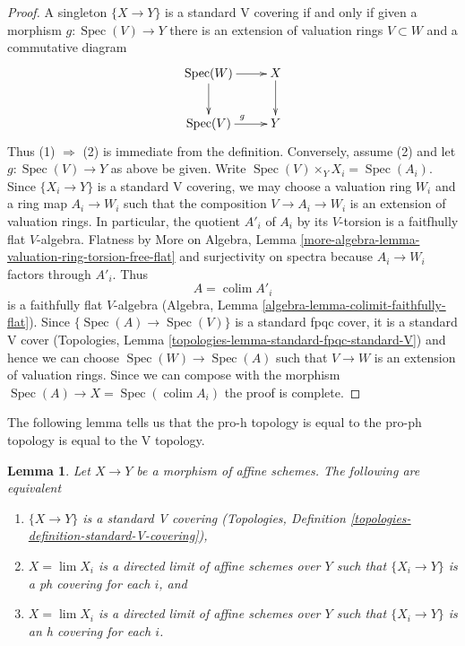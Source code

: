\documentclass{stacks-project}
\theoremstyle{plain}
\newtheorem{lemma}[subsection]{Lemma}
\theoremstyle{definition}
\theoremstyle{remark}
\numberwithin{equation}{subsection}
\def\lim{\mathop{\mathrm{lim}}\nolimits}
\def\colim{\mathop{\mathrm{colim}}\nolimits}
\def\Spec{\mathop{\mathrm{Spec}}}
\begin{document}
\begin{proof}
A singleton $\{X \to Y\}$ is a standard V covering if and only if
given a morphism $g : \Spec(V) \to Y$ there is an extension of
valuation rings $V \subset W$ and a commutative diagram
$$
\xymatrix{
\Spec(W) \ar[r] \ar[d] & X \ar[d] \\
\Spec(V) \ar[r]^g & Y
}
$$
Thus (1) $\Rightarrow$ (2) is immediate from the definition.
Conversely, assume (2) and let $g : \Spec(V) \to Y$ as above
be given. Write $\Spec(V) \times_Y X_i = \Spec(A_i)$.
Since $\{X_i \to Y\}$ is a standard V covering, we may choose
a valuation ring $W_i$ and a ring map $A_i \to W_i$ such that
the composition $V \to A_i \to W_i$ is an extension of valuation
rings. In particular, the quotient $A'_i$ of $A_i$ by its
$V$-torsion is a faitfhully flat $V$-algebra. Flatness by
More on Algebra, Lemma
\ref{more-algebra-lemma-valuation-ring-torsion-free-flat} and
surjectivity on spectra because $A_i \to W_i$ factors through $A'_i$.
Thus
$$
A = \colim A'_i
$$
is a faithfully flat $V$-algebra
(Algebra, Lemma \ref{algebra-lemma-colimit-faithfully-flat}).
Since $\{\Spec(A) \to \Spec(V)\}$ is a standard fpqc cover, it
is a standard V cover
(Topologies, Lemma \ref{topologies-lemma-standard-fpqc-standard-V})
and hence we can choose $\Spec(W) \to \Spec(A)$ such that
$V \to W$ is an extension of valuation rings. Since we can compose
with the morphism $\Spec(A) \to X = \Spec(\colim A_i)$
the proof is complete.
\end{proof}

\noindent
The following lemma tells us that the pro-h topology is equal to the
pro-ph topology is equal to the V topology.

\begin{lemma}
\label{lemma-pro-h-V}
Let $X \to Y$ be a morphism of affine schemes. The following are equivalent
\begin{enumerate}
\item $\{X \to Y\}$ is a standard V covering
(Topologies, Definition \ref{topologies-definition-standard-V-covering}),
\item $X = \lim X_i$ is a directed limit of affine schemes over $Y$
such that $\{X_i \to Y\}$ is a ph covering for each $i$, and
\item $X = \lim X_i$ is a directed limit of affine schemes over $Y$
such that $\{X_i \to Y\}$ is an h covering for each $i$.
\end{enumerate}
\end{lemma}
\end{document}
